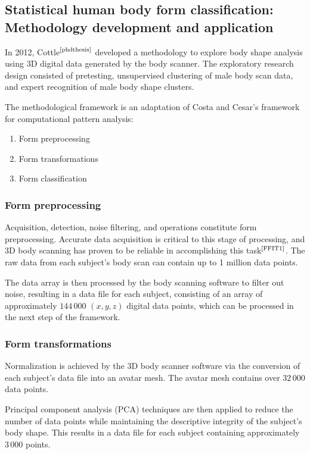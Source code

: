 \documentclass[12pt,a4paper,openany,UKenglish]{scrreprt}
\newcommand{\bib}[1]{$^\text{\cite{#1}}$}
\begin{document}
\subsection{Statistical human body form classification: Methodology development and application}
In 2012, Cottle\bib{phdthesis} developed a methodology to explore body shape analysis using 3D digital data generated by the body scanner. The exploratory research design consisted of pretesting, unsupervised clustering of male body scan data, and expert recognition of male body shape clusters.

The methodological framework is an adaptation of Costa and Cesar's framework for computational pattern analysis:
\begin{enumerate}[nolistsep]
	\item Form preprocessing
	\item Form transformations
	\item Form classification
\end{enumerate}

\subsubsection{Form preprocessing}
Acquisition, detection, noise filtering, and operations constitute form preprocessing.
Accurate data acquisition is critical to this stage of processing, and 3D body scanning has proven to be reliable in accomplishing this task\bib{FFIT1}.
The raw data from each subject's body scan can contain up to 1 million data points.

The data array is then processed by the body scanning software to filter out noise, resulting in a data file for each subject, consisting of an array of approximately $144\,000$ $(x, y, z)$ digital data points, which can be processed in the next step of the framework.

\subsubsection{Form transformations}
Normalization is achieved by the 3D body scanner software via the conversion of each subject's data file into an avatar mesh.
The avatar mesh contains over $32\,000$ data points.

Principal component analysis (PCA) techniques are then applied to reduce the number of data points while maintaining the descriptive integrity of the subject's body shape.
This results in a data file for each subject containing approximately $3\,000$ points.
\end{document}
